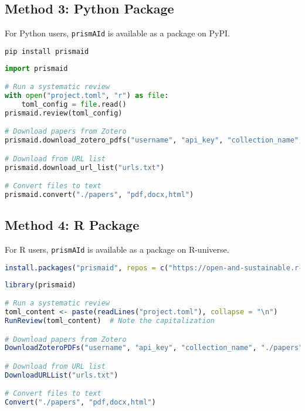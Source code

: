 \subsection{Method 3: Python Package}

For Python users, \texttt{prismAId} is available as a package on PyPI.

\begin{commandbox}
\begin{lstlisting}[language=Bash]
pip install prismaid
\end{lstlisting}
\end{commandbox}

\begin{commandbox}
\begin{lstlisting}[language=Python]
import prismaid

# Run a systematic review
with open("project.toml", "r") as file:
    toml_config = file.read()
prismaid.review(toml_config)

# Download papers from Zotero
prismaid.download_zotero_pdfs("username", "api_key", "collection_name", "./papers")

# Download from URL list
prismaid.download_url_list("urls.txt")

# Convert files to text
prismaid.convert("./papers", "pdf,docx,html")
\end{lstlisting}
\end{commandbox}

\subsection{Method 4: R Package}

For R users, \texttt{prismAId} is available as a package on R-universe.

\begin{commandbox}
\begin{lstlisting}[language=R]
install.packages("prismaid", repos = c("https://open-and-sustainable.r-universe.dev", "https://cloud.r-project.org"))
\end{lstlisting}
\end{commandbox}

\begin{commandbox}
\begin{lstlisting}[language=R]
library(prismaid)

# Run a systematic review
toml_content <- paste(readLines("project.toml"), collapse = "\n")
RunReview(toml_content)  # Note the capitalization

# Download papers from Zotero
DownloadZoteroPDFs("username", "api_key", "collection_name", "./papers")

# Download from URL list
DownloadURLList("urls.txt")

# Convert files to text
Convert("./papers", "pdf,docx,html")
\end{lstlisting}
\end{commandbox}

